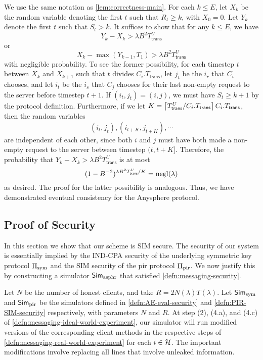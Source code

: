  We use the same notation as \cref{lem:correctness-main}. For each $k \leq E$, let $X_k$ be the random variable denoting the first $t$ such that $R_t \geq k$, with $X_0 = 0$. Let $Y_k$ denote the first $t$ such that $S_{t} > k$. It suffices to show that for any $k \leq E$, we have
 $$Y_k - X_k > \lambda B^2 T^U_{\mathsf{trans}}$$
 or
 $$X_{k} - \max(Y_{k - 1}, T_1) > \lambda B^2 T^U_{\mathsf{trans}}$$
 with negligible probability. To see the former possibility, for each timestep $t$ between $X_k$ and $X_{k + 1}$ such that $t$ divides $C_i.T_{\mathsf{trans}}$, let $j_t$ be the $i_r$ that $C_i$ chooses, and let $i_t$ be the $i_s$ that $C_j$ chooses for their last non-empty request to the server before timestep $t + 1$. If $(i_t, j_t) = (i, j)$, we must have $S_{t} \geq k + 1$ by the protocol definition. Furthermore, if we let $K = \left\lceil T^U_{\mathsf{trans}} / C_i.T_{\mathsf{trans}} \right\rceil C_i.T_{\mathsf{trans}}$, then the random variables
 $$(i_t, j_t), (i_{t + K}, j_{t + K}), \cdots$$
are independent of each other, since both $i$ and $j$ must have both made a non-empty request to the server between timestep $(t, t + K]$. Therefore, the probability that $Y_k - X_k > \lambda B^2 T^U_{\mathsf{trans}}$ is at most
$$(1 - B^{-2})^{\lambda B^2 T^U_{\mathsf{trans}} / K} = \operatorname{negl}(\lambda)$$
as desired. The proof for the latter possibility is analogous. Thus, we have demonstrated eventual consistency for the Anysphere protocol.
\subsection{Proof of Security}
In this section we show that our scheme is SIM secure. The security of our system is essentially implied by the IND-CPA security of the underlying symmetric key protocol $\Pi_{\text{sym}}$ and the SIM security of the pir protocol $\Pi_{\text{pir}}$. We now justify this by constructing a simulator $\mathsf{Sim}_{\text{asphr}}$ that satisfied \cref{defn:messaging-security}.

Let $N$ be the number of honest clients, and take $R = 2N(\lambda)T(\lambda)$. Let $\mathsf{Sim}_{\text{sym}}$ and $\mathsf{Sim}_{\text{pir}}$ be the simulators defined in \cref{defn:AE-eval-security} and \cref{defn:PIR-SIM-security} respectively, with parameters $N$ and $R$. At step (2), (4.a), and (4.c) of \cref{defn:messaging-ideal-world-experiment}, our simulator will run modified versions of the corresponding client methods in the respective steps of \cref{defn:messaging-real-world-experiment} for each $i \in \mathcal{H}$. The important modifications involve replacing all lines that involve unleaked information.

